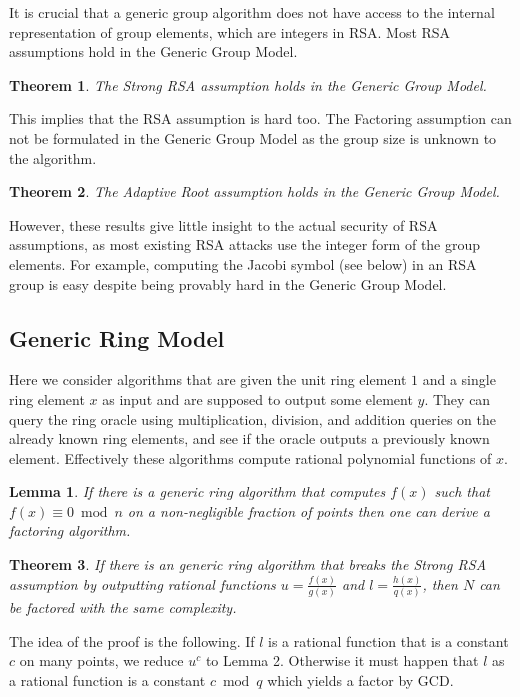 \documentclass[a4paper]{article}
\newtheorem{theorem}{Theorem}
\newtheorem{lemma}{Lemma}
\begin{document}
It is crucial that a generic group algorithm does not have access to the internal representation of group elements, which are integers in RSA. 
Most RSA assumptions hold in the Generic Group Model. 
\begin{theorem}\cite{DBLP:conf/eurocrypt/DamgardK02}
The Strong RSA assumption holds in the Generic Group Model.
\end{theorem}
This implies that the RSA assumption is hard too. The Factoring assumption can not be formulated in the Generic Group Model as the group size is unknown to the algorithm.
\begin{theorem}\cite{cryptoeprint:2019:1229}
The Adaptive Root assumption holds in the Generic Group Model.
\end{theorem}
However, these results give little insight to the actual security of RSA assumptions, as most existing RSA attacks use the integer form of the group elements. For example, computing the Jacobi symbol (see below) in an RSA group is easy despite being provably hard in the Generic Group Model.

\subsection{Generic Ring Model}

Here we consider algorithms that are given the unit ring element $1$ and a single ring element $x$ as input and are supposed to output some element $y$. They can query the ring oracle using multiplication, division, and addition queries on the already known ring elements, and see if the oracle outputs a previously known element. Effectively these algorithms compute rational polynomial functions of $x$.

\begin{lemma}\cite{DBLP:conf/eurocrypt/AggarwalM09}
If there is a generic ring algorithm that computes $f(x)$ such that $f(x)\equiv 0 \bmod{n}$ on a non-negligible fraction of points then one can derive a factoring algorithm.
\end{lemma}

\begin{theorem}\cite{aggarwal2011equivalence}
If there is an generic ring algorithm that breaks the Strong RSA assumption by outputting rational functions $u=\frac{f(x)}{g(x)}$ and $l=\frac{h(x)}{q(x)}$, then $N$ can be factored with the same complexity.
\end{theorem}
The idea of the proof is the following. If $l$ is a rational function that is a constant $c$ on many points, we reduce $u^c$ to Lemma 2. Otherwise it must happen that $l$ as a rational function is a constant $c\bmod{q}$ which yields a factor by GCD.
\end{document}
